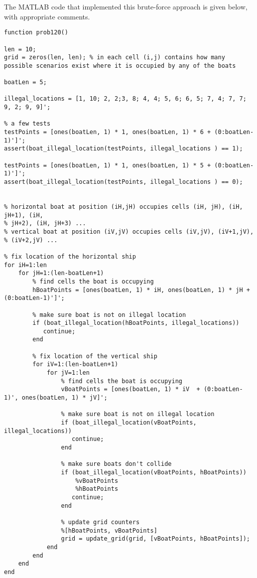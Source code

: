 \documentclass[11pt,a4paper,oneside]{report}
\begin{document}
The MATLAB code that implemented this brute-force approach is given below, with appropriate comments. 
\begin{lstlisting}
function prob120()

len = 10;
grid = zeros(len, len); % in each cell (i,j) contains how many possible scenarios exist where it is occupied by any of the boats

boatLen = 5;

illegal_locations = [1, 10; 2, 2;3, 8; 4, 4; 5, 6; 6, 5; 7, 4; 7, 7; 9, 2; 9, 9]';

% a few tests
testPoints = [ones(boatLen, 1) * 1, ones(boatLen, 1) * 6 + (0:boatLen-1)']'; 
assert(boat_illegal_location(testPoints, illegal_locations ) == 1);

testPoints = [ones(boatLen, 1) * 1, ones(boatLen, 1) * 5 + (0:boatLen-1)']'; 
assert(boat_illegal_location(testPoints, illegal_locations ) == 0);


% horizontal boat at position (iH,jH) occupies cells (iH, jH), (iH, jH+1), (iH,
% jH+2), (iH, jH+3) ...
% vertical boat at position (iV,jV) occupies cells (iV,jV), (iV+1,jV),
% (iV+2,jV) ...

% fix location of the horizontal ship
for iH=1:len
    for jH=1:(len-boatLen+1)
        % find cells the boat is occupying
        hBoatPoints = [ones(boatLen, 1) * iH, ones(boatLen, 1) * jH + (0:boatLen-1)']';  
        
        % make sure boat is not on illegal location
        if (boat_illegal_location(hBoatPoints, illegal_locations))
           continue; 
        end    
        
        % fix location of the vertical ship
        for iV=1:(len-boatLen+1)
            for jV=1:len
                % find cells the boat is occupying
                vBoatPoints = [ones(boatLen, 1) * iV  + (0:boatLen-1)', ones(boatLen, 1) * jV]'; 
                        
                % make sure boat is not on illegal location
                if (boat_illegal_location(vBoatPoints, illegal_locations))
                   continue; 
                end    
                
                % make sure boats don't collide
                if (boat_illegal_location(vBoatPoints, hBoatPoints))
                    %vBoatPoints
                    %hBoatPoints
                   continue; 
                end

                % update grid counters
                %[hBoatPoints, vBoatPoints]
                grid = update_grid(grid, [vBoatPoints, hBoatPoints]);
            end
        end
    end
end


\end{lstlisting}
\end{document}
